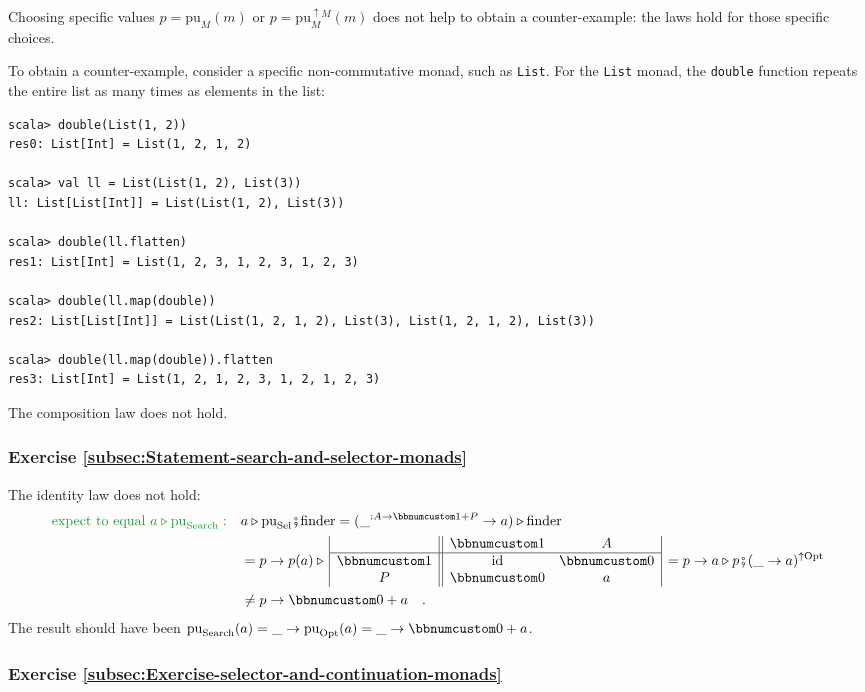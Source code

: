 Choosing specific values $p=\text{pu}_{M}(m)$ or $p=\text{pu}_{M}^{\uparrow M}(m)$
does not help to obtain a counter-example: the laws hold for those
specific choices.

To obtain a counter-example, consider a specific non-commutative monad,
such as \lstinline!List!. For the \lstinline!List! monad, the \lstinline!double!
function repeats the entire list as many times as elements in the
list:
\begin{lstlisting}
scala> double(List(1, 2))
res0: List[Int] = List(1, 2, 1, 2)

scala> val ll = List(List(1, 2), List(3))
ll: List[List[Int]] = List(List(1, 2), List(3))

scala> double(ll.flatten)
res1: List[Int] = List(1, 2, 3, 1, 2, 3, 1, 2, 3)

scala> double(ll.map(double))
res2: List[List[Int]] = List(List(1, 2, 1, 2), List(3), List(1, 2, 1, 2), List(3)) 

scala> double(ll.map(double)).flatten
res3: List[Int] = List(1, 2, 1, 2, 3, 1, 2, 1, 2, 3)
\end{lstlisting}
The composition law does not hold.

\subsubsection*{Exercise \ref{subsec:Statement-search-and-selector-monads}}

The identity law does not hold:
\begin{align*}
{\color{greenunder}\text{expect to equal }a\triangleright\text{pu}_{\text{Search}}:}\quad & a\triangleright\text{pu}_{\text{Sel}}\bef\text{finder}=(\_^{:A\rightarrow\bbnum 1+P}\rightarrow a)\triangleright\text{finder}\\
 & =p\rightarrow p(a)\triangleright\,\begin{array}{|c||cc|}
 & \bbnum 1 & A\\
\hline \bbnum 1 & \text{id} & \bbnum 0\\
P & \bbnum 0 & a
\end{array}\,=p\rightarrow a\triangleright p\bef(\_\rightarrow a)^{\uparrow\text{Opt}}\\
 & \neq p\rightarrow\bbnum 0+a\quad.
\end{align*}
The result should have been $\text{pu}_{\text{Search}}(a)=\_\rightarrow\text{pu}_{\text{Opt}}(a)=\_\rightarrow\bbnum 0+a$.

\subsubsection*{Exercise \ref{subsec:Exercise-selector-and-continuation-monads}}

